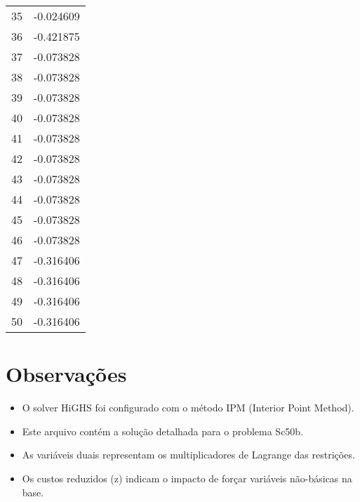 \documentclass[12pt]{article}
\begin{document}
\begin{longtable}{@{}cc@{}}
35 & -0.024609 \\
36 & -0.421875 \\
37 & -0.073828 \\
38 & -0.073828 \\
39 & -0.073828 \\
40 & -0.073828 \\
41 & -0.073828 \\
42 & -0.073828 \\
43 & -0.073828 \\
44 & -0.073828 \\
45 & -0.073828 \\
46 & -0.073828 \\
47 & -0.316406 \\
48 & -0.316406 \\
49 & -0.316406 \\
50 & -0.316406 \\

\end{longtable}


\section{Observações}

\begin{itemize}
\item O solver HiGHS foi configurado com o método IPM (Interior Point Method).
\item Este arquivo contém a solução detalhada para o problema Sc50b.
\item As variáveis duais representam os multiplicadores de Lagrange das restrições.
\item Os custos reduzidos (z) indicam o impacto de forçar variáveis não-básicas na base.
\end{itemize}
\end{document}
